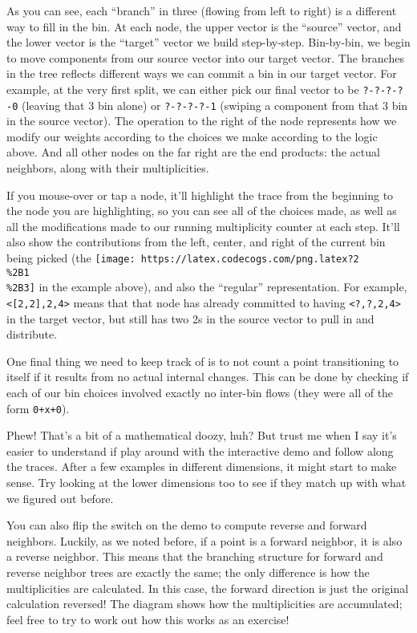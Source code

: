 \documentclass[]{article}
\begin{document}
As you can see, each ``branch'' in three (flowing from left to right) is a
different way to fill in the bin. At each node, the upper vector is the
``source'' vector, and the lower vector is the ``target'' vector we build
step-by-step. Bin-by-bin, we begin to move components from our source vector
into our target vector. The branches in the tree reflects different ways we can
commit a bin in our target vector. For example, at the very first split, we can
either pick our final vector to be \texttt{?-?-?-?-0} (leaving that 3 bin alone)
or \texttt{?-?-?-?-1} (swiping a component from that 3 bin in the source
vector). The operation to the right of the node represents how we modify our
weights according to the choices we make according to the logic above. And all
other nodes on the far right are the end products: the actual neighbors, along
with their multiplicities.

If you mouse-over or tap a node, it'll highlight the trace from the beginning to
the node you are highlighting, so you can see all of the choices made, as well
as all the modifications made to our running multiplicity counter at each step.
It'll also show the contributions from the left, center, and right of the
current bin being picked (the
\texttt{[image: https://latex.codecogs.com/png.latex?2\\\%2B1\\\%2B3]} in the
example above), and also the ``regular'' representation. For example,
\texttt{\textless{}{[}2,2{]},2,4\textgreater{}} means that that node has already
committed to having \texttt{\textless{}?,?,2,4\textgreater{}} in the target
vector, but still has two 2s in the source vector to pull in and distribute.

One final thing we need to keep track of is to not count a point transitioning
to itself if it results from no actual internal changes. This can be done by
checking if each of our bin choices involved exactly no inter-bin flows (they
were all of the form \texttt{0+x+0}).

Phew! That's a bit of a mathematical doozy, huh? But trust me when I say it's
easier to understand if play around with the interactive demo and follow along
the traces. After a few examples in different dimensions, it might start to make
sense. Try looking at the lower dimensions too to see if they match up with what
we figured out before.

You can also flip the switch on the demo to compute reverse and forward
neighbors. Luckily, as we noted before, if a point is a forward neighbor, it is
also a reverse neighbor. This means that the branching structure for forward and
reverse neighbor trees are exactly the same; the only difference is how the
multiplicities are calculated. In this case, the forward direction is just the
original calculation reversed! The diagram shows how the multiplicities are
accumulated; feel free to try to work out how this works as an exercise!
\end{document}
